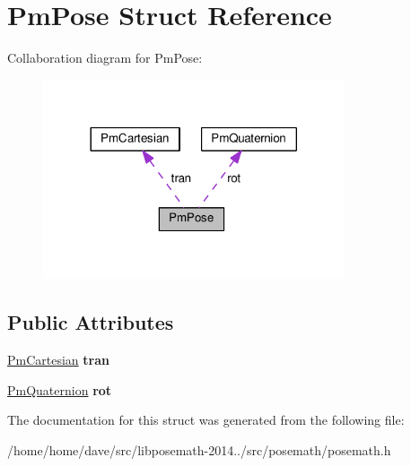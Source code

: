 \hypertarget{structPmPose}{}\section{Pm\+Pose Struct Reference}
\label{structPmPose}


Collaboration diagram for Pm\+Pose\+:
\nopagebreak
\begin{figure}[H]
\begin{center}
\leavevmode
\includegraphics[width=252pt]{structPmPose__coll__graph}
\end{center}
\end{figure}
\subsection*{Public Attributes}
\begin{DoxyCompactItemize}
\item 
\hypertarget{structPmPose_a1e6e45c5385628f5fc385cabe1f5294b}{}\hyperlink{structPmCartesian}{Pm\+Cartesian} {\bfseries tran}\label{structPmPose_a1e6e45c5385628f5fc385cabe1f5294b}

\item 
\hypertarget{structPmPose_acf1225d1b132e7945d4ac2c69711c1fe}{}\hyperlink{structPmQuaternion}{Pm\+Quaternion} {\bfseries rot}\label{structPmPose_acf1225d1b132e7945d4ac2c69711c1fe}

\end{DoxyCompactItemize}


The documentation for this struct was generated from the following file\+:\begin{DoxyCompactItemize}
\item 
/home/home/dave/src/libposemath-\/2014../src/posemath/posemath.\+h\end{DoxyCompactItemize}
